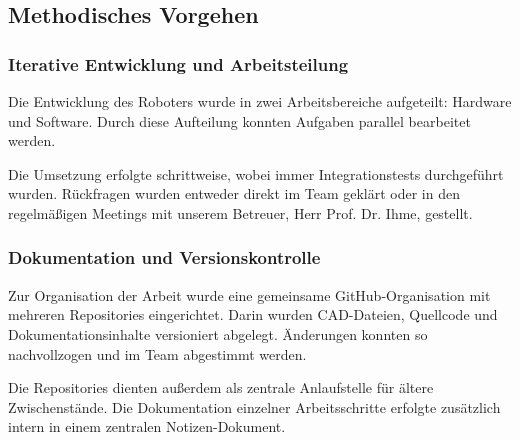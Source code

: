 
\subsection{Methodisches Vorgehen}

\subsubsection{Iterative Entwicklung und Arbeitsteilung}

Die Entwicklung des Roboters wurde in zwei Arbeitsbereiche aufgeteilt: Hardware und Software. Durch diese Aufteilung konnten Aufgaben parallel bearbeitet werden.

Die Umsetzung erfolgte schrittweise, wobei immer Integrationstests durchgeführt wurden. Rückfragen wurden entweder direkt im Team geklärt oder in den regelmäßigen Meetings mit unserem Betreuer, Herr Prof. Dr. Ihme, gestellt. 

\subsubsection{Dokumentation und Versionskontrolle}

Zur Organisation der Arbeit wurde eine gemeinsame GitHub-Organisation mit mehreren Repositories eingerichtet. Darin wurden CAD-Dateien, Quellcode und Dokumentationsinhalte versioniert abgelegt. Änderungen konnten so nachvollzogen und im Team abgestimmt werden.

Die Repositories dienten außerdem als zentrale Anlaufstelle für ältere Zwischenstände. Die Dokumentation einzelner Arbeitsschritte erfolgte zusätzlich intern in einem zentralen Notizen-Dokument.
